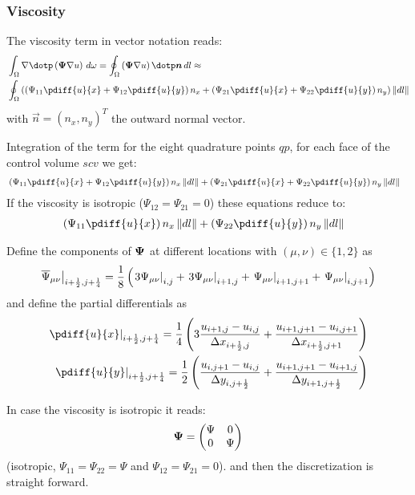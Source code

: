 \subsubsection{Viscosity}
The viscosity term in vector notation reads:
\begin{align}
    &\int_\Omega \nabla \dotp \left( \mat{\Psi} \nabla u \right) \, d\omega  =
    \oint_{\Omega}  \left(  \mat{\Psi} \nabla u \right) \dotp \vec{n}\, dl \approx
    \\
    & \oint_{\Omega}  \left( \left( \Psi_{11} \pdiff{{u}}{x} + \Psi_{12} \pdiff{{u}}{y}  \right) n_x + \left( \Psi_{21} \pdiff{{u}}{x} + \Psi_{22} \pdiff{{u}}{y}  \right) n_y \right) \norm{dl}
\end{align}
with $\vec{n} = (n_x, n_y)^T$ the outward normal vector.

Integration of the term for the eight quadrature points $qp$, for each face of the control volume $scv$  we get:
%
\begin{align}
&
\left( \Psi_{11} \pdiff{{u}}{x} + \Psi_{12} \pdiff{{u}}{y} \right) n_x \norm{dl} +
\left( \Psi_{21} \pdiff{{u}}{x} + \Psi_{22} \pdiff{{u}}{y} \right) n_y \norm{dl}
\end{align}
If the  viscosity is isotropic ($\Psi_{12} = \Psi_{21} = 0$) these equations reduce to:
\begin{align}
    &
    \left( \Psi_{11} \pdiff{{u}}{x} \right) n_x \norm{dl} +
    \left( \Psi_{22} \pdiff{{u}}{y} \right) n_y \norm{dl}
\end{align}

Define the components of $\boldsymbol{\Psi}$ at different locations with $(\mu, \nu) \in \{ 1, 2\}$ as
%
\begin{align}
    \left. \overline\Psi_{\mu\nu} \right|_{i+\frac{1}{2},j+\frac{1}{4}} = \frac{1}{8} \left(\left. 3\Psi_{\mu\nu} \right|_{i,j}
    + \left. 3\Psi_{\mu\nu} \right|_{i+1,j} + \left. \Psi_{\mu\nu} \right|_{i+1,j+1}  + \left. \Psi_{\mu\nu} \right|_{i,j+1}\right)
\end{align}
%
and define the partial differentials as
\begin{align}
    \left. \pdiff{u}{x} \right|_{i+\half,j+\quart} =  \quart \left(3\frac{u_{i+1,j} - u_{i,j}}{\Dx_{i+\half,j}} + \frac{u_{i+1,j+1} - u_{i,j+1}}{\Dx_{i+\half,j+1}}\right)
    \\
    \left. \pdiff{u}{y} \right|_{i+\half,j+\quart} =  \half \left(\frac{u_{i,j+1} - u_{i,j}}{\Dy_{i,j+\half}} + \frac{u_{i+1,j+1} - u_{i+1,j}}{\Dy_{i+1,j+\half}}\right)
\end{align}

In case the viscosity is isotropic it reads:
\begin{align}
    \boldsymbol{\Psi} =
    \begin{pmatrix}
        \Psi & 0 \\
        0 & \Psi
    \end{pmatrix}
\end{align}
(isotropic, $\Psi_{11} = \Psi_{22} = \Psi$ and $\Psi_{12} = \Psi_{21} = 0$).
and then the discretization is straight forward.